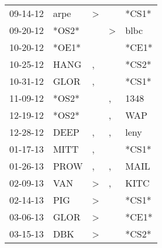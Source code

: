 \begin{supertabular}{p{0.07\textwidth}p{0.06\textwidth}p{0.02\textwidth}p{0.02\textwidth}p{0.06\textwidth}}
          09-14-12\textsuperscript{} &           arpe\textsuperscript{} &     \textgreater &                  &                            *CS1* \\
          09-20-12\textsuperscript{} &                            *OS2* &                  &     \textgreater &           blbc\textsuperscript{} \\
          10-20-12\textsuperscript{} &                            *OE1* &                  &                  &                            *CE1* \\
          10-25-12\textsuperscript{} &           HANG\textsuperscript{} &                , &                  &                            *CS2* \\
          10-31-12\textsuperscript{} &           GLOR\textsuperscript{} &                , &                  &                            *CS1* \\
          11-09-12\textsuperscript{} &                            *OS2* &                  &                , &           1348\textsuperscript{} \\
          12-19-12\textsuperscript{} &                            *OS2* &                  &                , &            WAP\textsuperscript{} \\
          12-28-12\textsuperscript{} &           DEEP\textsuperscript{} &                , &                , &           leny\textsuperscript{} \\
          01-17-13\textsuperscript{} &           MITT\textsuperscript{} &                , &                  &                            *CS1* \\
          01-26-13\textsuperscript{} &           PROW\textsuperscript{} &                , &                , &           MAIL\textsuperscript{} \\
          02-09-13\textsuperscript{} &            VAN\textsuperscript{} &     \textgreater &                , &           KITC\textsuperscript{} \\
          02-14-13\textsuperscript{} &            PIG\textsuperscript{} &     \textgreater &                  &                            *CS1* \\
          03-06-13\textsuperscript{} &           GLOR\textsuperscript{} &     \textgreater &                  &                            *CE1* \\
          03-15-13\textsuperscript{} &            DBK\textsuperscript{} &     \textgreater &                  &                            *CS2* \\

\end{supertabular}
